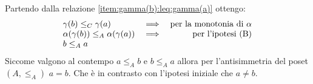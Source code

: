 {	Partendo dalla relazione \ref{item:gamma(b):leq:gamma(a)} ottengo:
	\begin{displaymath}
	\begin{array}[\textwidth]{llr}
	\gamma(b) \leq_C \gamma(a) 					& \implies & \text{per la monotonia di $\alpha$} \\
	\alpha(\gamma(b)) \leq_A \alpha(\gamma(a))  & \implies & \text{per l'ipotesi (B)} \\
	b \leq_A a									& \\
	\end{array}
	\end{displaymath}
	Siccome valgono al contempo $a \leq_A b$ e $b \leq_A a$ allora per l'antisimmetria del poset $(A, \leq_A)$
	$a = b$. Che è in contrasto con l'ipotesi iniziale che $a \neq b$.
	
	

}